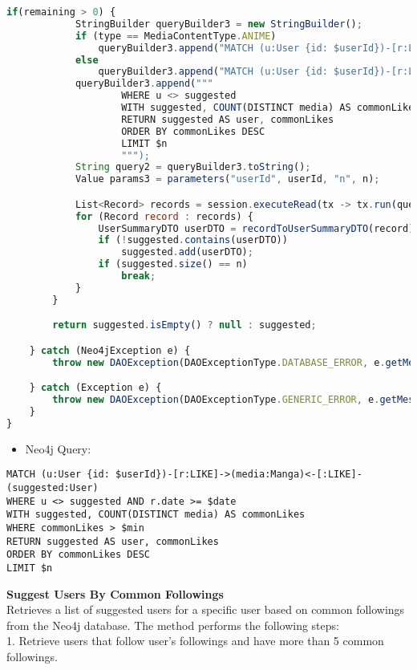 \begin{lstlisting}[language=JavaScript]
        if(remaining > 0) {
            StringBuilder queryBuilder3 = new StringBuilder();
            if (type == MediaContentType.ANIME)
                queryBuilder3.append("MATCH (u:User {id: $userId})-[r:LIKE]->(media:Anime)<-[:LIKE]-(suggested:User) ");
            else
                queryBuilder3.append("MATCH (u:User {id: $userId})-[r:LIKE]->(media:Manga)<-[:LIKE]-(suggested:User) ");
            queryBuilder3.append("""
                    WHERE u <> suggested
                    WITH suggested, COUNT(DISTINCT media) AS commonLikes
                    RETURN suggested AS user, commonLikes
                    ORDER BY commonLikes DESC
                    LIMIT $n
                    """);
            String query2 = queryBuilder3.toString();
            Value params3 = parameters("userId", userId, "n", n);

            List<Record> records = session.executeRead(tx -> tx.run(query2, params3).list());
            for (Record record : records) {
                UserSummaryDTO userDTO = recordToUserSummaryDTO(record);
                if (!suggested.contains(userDTO))
                    suggested.add(userDTO);
                if (suggested.size() == n)
                    break;
            }
        }

        return suggested.isEmpty() ? null : suggested;

    } catch (Neo4jException e) {
        throw new DAOException(DAOExceptionType.DATABASE_ERROR, e.getMessage());

    } catch (Exception e) {
        throw new DAOException(DAOExceptionType.GENERIC_ERROR, e.getMessage());
    }
}
\end{lstlisting}
\begin{itemize}
    \item Neo4j Query:
\end{itemize}
\begin{lstlisting}[language=Cypher]
MATCH (u:User {id: $userId})-[r:LIKE]->(media:Manga)<-[:LIKE]-(suggested:User) 
WHERE u <> suggested AND r.date >= $date
WITH suggested, COUNT(DISTINCT media) AS commonLikes
WHERE commonLikes > $min
RETURN suggested AS user, commonLikes
ORDER BY commonLikes DESC
LIMIT $n
\end{lstlisting}
\textbf{Suggest Users By Common Followings}\\
Retrieves a list of suggested users for a specific user based on common followings from the Neo4j database.
The method performs the following steps:\\
1. Retrieve users that follow user's followings and have more than 5 common followings.\\

